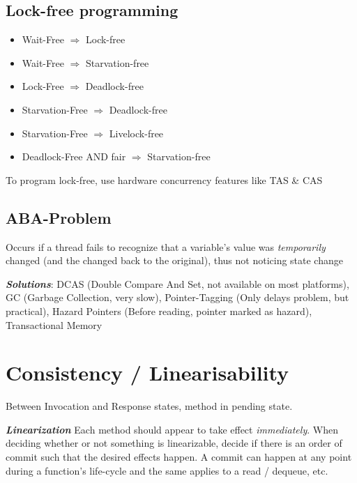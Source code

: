\documentclass{article}
\begin{document}
\subsection{Lock-free programming}
\vspace{-0.7pc}
\begin{multicols}{2}
    \begin{itemize}
        \item Wait-Free $\Rightarrow$ Lock-free
        \item Wait-Free $\Rightarrow$ Starvation-free
        \item Lock-Free $\Rightarrow$ Deadlock-free
        \item Starvation-Free $\Rightarrow$ Deadlock-free
        \item Starvation-Free $\Rightarrow$ Livelock-free
        \item Deadlock-Free AND fair $\Rightarrow$ Starvation-free
    \end{itemize}
\end{multicols}

To program lock-free, use hardware concurrency features like TAS \& CAS


\subsection{ABA-Problem}
Occurs if a thread fails to recognize that a variable's value was \textit{temporarily} changed (and the changed back to the original), thus not noticing state change

\textbf{\textit{Solutions}}: DCAS (Double Compare And Set, not available on most platforms), GC (Garbage Collection, very slow), Pointer-Tagging (Only delays problem, but practical), Hazard Pointers (Before reading, pointer marked as hazard), Transactional Memory


\newsection
\section{Consistency / Linearisability}
Between Invocation and Response states, method in pending state.

\textbf{\textit{Linearization}} Each method should appear to take effect \textit{immediately}.
When deciding whether or not something is linearizable, decide if there is an order of commit such that the desired effects happen.
A commit can happen at any point during a function's life-cycle and the same applies to a read / dequeue, etc.
\end{document}
